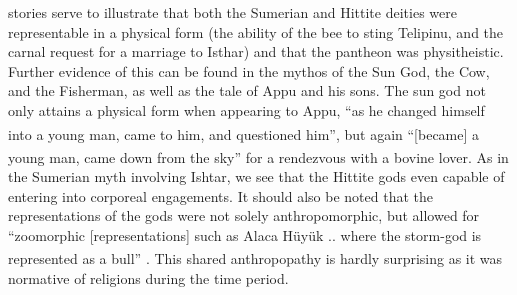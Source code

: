 stories serve to illustrate that both the Sumerian and Hittite deities
were representable in a physical form (the ability of the bee to sting
Telipinu, and the carnal request for a marriage to Isthar) and that
the pantheon was physitheistic. 
Further evidence of this can be found in the mythos of the Sun God,
the Cow, and the Fisherman, as well as the tale of Appu and his
sons. The sun god not only attains a physical form when appearing to
Appu, ``as he changed himself into a young man, came to him, and
questioned him''\textsuperscript{\cite[p.83]{hoffner}}, but again
``[became] a young man, came down from the sky'' for a rendezvous with
a bovine lover\textsuperscript{\cite[p.85]{hoffner}}.
As in the Sumerian myth involving Ishtar, we see that the Hittite gods
even capable of entering into corporeal engagements.  It should also
be noted that the representations of the gods were not solely
anthropomorphic, but allowed for ``zoomorphic [representations] such
as Alaca H\"uy\"uk .. where the storm-god is represented as a
bull'' \textsuperscript{\cite[p.1990]{sasson}}. This shared
anthropopathy is hardly surprising as it was normative of religions
during the time period.

